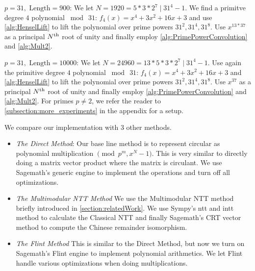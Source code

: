 {\bf \(p = 31, \text{ Length} = 900\)}: We let \(N = 1920 = 5 * 3 * 2^7 \mid 31^{4} - 1\). We find a primitve degree \(4\) polynomial \(\bmod \  31\): \(f_{4}(x) = x^4 + 3x^2 + 16x + 3\) and use \cref{alg:HenselLift} to lift the polynomial over prime powers \(31^2, 31^4, 31^8\). Use \(x^{13*37} \) as a principal \(N\textsuperscript{th}\) root of unity and finally employ \cref{alg:PrimePowerConvolution} and \cref{alg:Mult2}.

{\bf \(p = 31, \text{ Length} = 10000\)}: We let \(N = 24960 = 13 * 5 * 3 * 2^7 \mid 31^{4} - 1\). Use again the primitive degree \(4\) polynomial \(\bmod \  31\): \(f_{4}(x) = x^4 + 3x^2 + 16x + 3\) and \cref{alg:HenselLift} to lift the polynomial over prime powers \(31^2, 31^4, 31^8\). Use \(x^{37} \) as a principal \(N\textsuperscript{th}\) root of unity and finally employ \cref{alg:PrimePowerConvolution} and \cref{alg:Mult2}.
\else
For primes \(p \ne 2\), we refer the reader to \cref{subsection:more_experiments} in the appendix for a setup.
\fi

We compare our implementation with 3 other methods.
\begin{itemize}
    \item \emph{The Direct Method}: Our base line method is to represent circular as polynomial multiplication \(\pmod{p^m, x^N - 1}\). This is very similar to directly doing a matrix vector product where the matrix is circulant. We use Sagemath's generic engine to implement the operations and turn off all optimizations.
    \item \emph{The Multimodular NTT Method} We use the Multimodular NTT method briefly introduced in \cref{section:relatedWork}. We use Sympy's ntt and intt method to calculate the Classical NTT and finally Sagemath's CRT vector method to compute the Chinese remainder isomorphism.
    \item \emph{The Flint Method} This is similar to the Direct Method, but now we turn on Sagemath's Flint engine to implement polynomial arithmetics. We let Flint \cite{OTHER:FLINT} handle various optimizations when doing multiplications.
\end{itemize}

